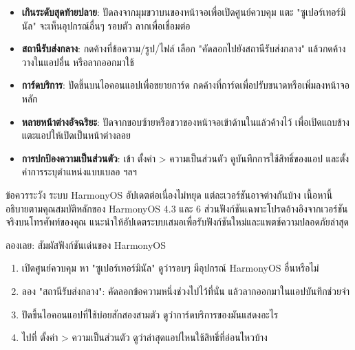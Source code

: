 
\begin{itemize}
  \item \textbf{เกินระดับสุดท้ายปลาย}: ปัดลงจากมุมขวาบนของหน้าจอเพื่อเปิดศูนย์ควบคุม แตะ "ซูเปอร์เทอร์มินัล" จะเห็นอุปกรณ์อื่นๆ รอบตัว ลากเพื่อเชื่อมต่อ
  \item \textbf{สถานีรับส่งกลาง}: กดค้างที่ข้อความ/รูป/ไฟล์ เลือก "คัดลอกไปยังสถานีรับส่งกลาง" แล้วกดค้างวางในแอปอื่น หรือลากออกมาใช้
  \item \textbf{การ์ดบริการ}: ปัดขึ้นบนไอคอนแอปเพื่อขยายการ์ด กดค้างที่การ์ดเพื่อปรับขนาดหรือเพิ่มลงหน้าจอหลัก
  \item \textbf{หลายหน้าต่างอัจฉริยะ}: ปัดจากขอบซ้ายหรือขวาของหน้าจอเข้าด้านในแล้วค้างไว้ เพื่อเปิดแถบข้าง แตะแอปให้เปิดเป็นหน้าต่างลอย
  \item \textbf{การปกป้องความเป็นส่วนตัว}: เข้า ตั้งค่า > ความเป็นส่วนตัว ดูบันทึกการใช้สิทธิ์ของแอป และตั้งค่าการระบุตำแหน่งแบบเบลอ ฯลฯ
\end{itemize}

\begin{tcbwarn}{ข้อควรระวัง}
ระบบ HarmonyOS อัปเดตต่อเนื่องไม่หยุด แต่ละเวอร์ชันอาจต่างกันบ้าง เนื้อหานี้อธิบายตามคุณสมบัติหลักของ HarmonyOS 4.3 และ 6 ส่วนฟังก์ชันเฉพาะโปรดอ้างอิงจากเวอร์ชันจริงบนโทรศัพท์ของคุณ แนะนำให้อัปเดตระบบเสมอเพื่อรับฟังก์ชันใหม่และแพตช์ความปลอดภัยล่าสุด

\end{tcbwarn}

\begin{tcbpractice}{ลองเลย: สัมผัสฟังก์ชันเด่นของ HarmonyOS}
\begin{enumerate}
  \item เปิดศูนย์ควบคุม หา "ซูเปอร์เทอร์มินัล" ดูว่ารอบๆ มีอุปกรณ์ HarmonyOS อื่นหรือไม่
  \item ลอง "สถานีรับส่งกลาง": คัดลอกข้อความหนึ่งช่วงไปไว้ที่นั่น แล้วลากออกมาในแอปบันทึกช่วยจำ
  \item ปัดขึ้นไอคอนแอปที่ใช้บ่อยสักสองสามตัว ดูว่าการ์ดบริการของมันแสดงอะไร
  \item ไปที่ ตั้งค่า > ความเป็นส่วนตัว ดูว่าล่าสุดแอปไหนใช้สิทธิ์ที่อ่อนไหวบ้าง
\end{enumerate}

\end{tcbpractice}

